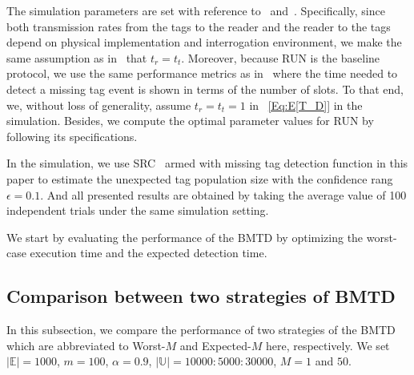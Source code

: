 \documentclass[10pt, twocolumn]{IEEEtran}
\begin{document}
The simulation parameters are set with reference to~\cite{luo2014missing} and~\cite{shahzad2015expecting}. Specifically, since both transmission rates from the tags to the reader and the reader to the tags depend on physical implementation and interrogation environment, we make the same assumption as in~\cite{luo2014missing} that $t_r=t_t$. Moreover, because RUN is the baseline protocol, we use the same performance metrics as in~\cite{shahzad2015expecting} where the time needed to detect a missing tag event is shown in terms of the number of slots. To that end, we, without loss of generality, assume $t_r=t_t=1$ in ~\eqref{Eq:E[T_D]} in the simulation.
Besides, we compute the optimal parameter values for RUN by following its specifications.

In the simulation, we use SRC~\cite{chen2013understanding} armed with missing tag detection function in this paper to estimate the unexpected tag population size with the confidence rang $\epsilon=0.1$. And all presented results are obtained by taking the average value of 100 independent trials under the same simulation setting.

We start by evaluating the performance of the BMTD by optimizing the worst-case execution time and the expected detection time.

\subsection{Comparison between two strategies of BMTD}

In this subsection, we compare the performance of two strategies of the BMTD which are abbreviated to Worst-$M$ and Expected-$M$ here, respectively. We set $|\mathbb{E}|=1000$, $m=100$, $\alpha=0.9$, $|\mathbb{U}|=10000:5000:30000$, $M=1$ and $50$.
\end{document}
